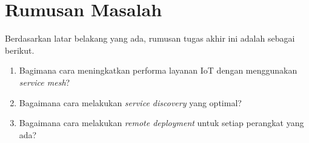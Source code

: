 \section{Rumusan Masalah}

Berdasarkan latar belakang yang ada, rumusan tugas akhir ini adalah sebagai berikut.
\begin{enumerate}
  \item Bagimana cara meningkatkan performa layanan IoT dengan menggunakan \textit{service mesh}?
  \item Bagaimana cara melakukan \textit{service discovery} yang optimal?
  \item Bagaimana cara melakukan \textit{remote deployment} untuk setiap perangkat yang ada?
\end{enumerate}